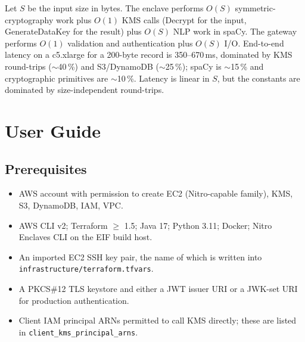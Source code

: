 \documentclass[11pt]{article}
\begin{document}
Let $S$ be the input size in bytes. The enclave performs $O(S)$
symmetric-cryptography work plus $O(1)$ KMS calls (Decrypt for the
input, GenerateDataKey for the result) plus $O(S)$ NLP work in
spaCy. The gateway performs $O(1)$ validation and authentication
plus $O(S)$ I/O. End-to-end latency on a c5.xlarge for a 200-byte
record is 350--670\,ms, dominated by KMS round-trips
($\sim$40\,\%) and S3/DynamoDB ($\sim$25\,\%); spaCy is
$\sim$15\,\% and cryptographic primitives are $\sim$10\,\%.
Latency is linear in $S$, but the constants are dominated by
size-independent round-trips.

\section{User Guide}

\subsection{Prerequisites}
\begin{itemize}\setlength{\itemsep}{1pt}
    \item AWS account with permission to create EC2 (Nitro-capable
    family), KMS, S3, DynamoDB, IAM, VPC.
    \item AWS CLI v2; Terraform $\ge$ 1.5; Java 17; Python 3.11;
    Docker; Nitro Enclaves CLI on the EIF build host.
    \item An imported EC2 SSH key pair, the name of which is
    written into \texttt{infrastructure/terraform.tfvars}.
    \item A PKCS\#12 TLS keystore and either a JWT issuer URI or a
    JWK-set URI for production authentication.
    \item Client IAM principal ARNs permitted to call KMS directly;
    these are listed in \texttt{client\_kms\_principal\_arns}.
\end{itemize}
\end{document}
